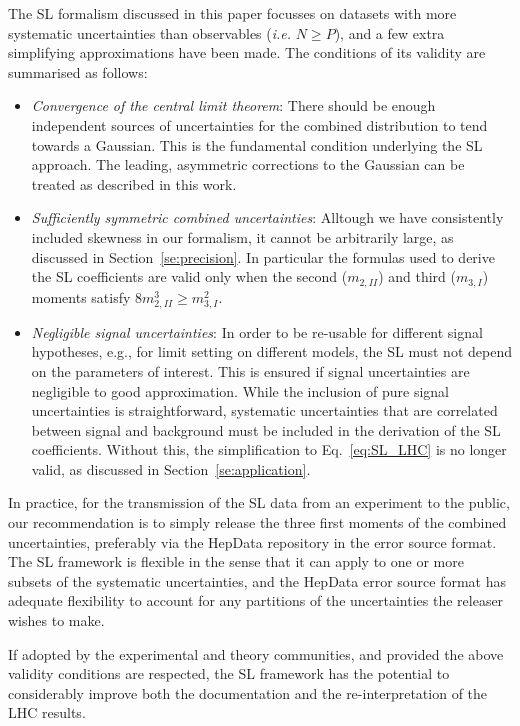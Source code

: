 \documentclass[11pt]{article}
\begin{document}
The SL formalism discussed in this paper focusses on datasets with more systematic uncertainties than observables
 (\textit{i.e.} $N\geq P$), and a few extra simplifying approximations have been made.  
The conditions of its validity are summarised as follows:
\begin{itemize}
\item \textit{Convergence of the central limit theorem}: 
There should be enough independent sources of uncertainties for the combined distribution to tend towards a Gaussian. 
This is the fundamental condition underlying the SL approach. The leading, asymmetric corrections to the Gaussian 
can be treated as described in this work.
\item \textit{Sufficiently symmetric combined uncertainties}: Alltough we have consistently included skewness in our formalism, it cannot be arbitrarily large, as discussed in Section~\ref{se:precision}. In particular the formulas used to derive the SL coefficients are valid only when the second ($m_{2,II}$) and third ($m_{3,I}$) moments satisfy $8m^{3}_{2,II}\geq m^{2}_{3,I}$. 
\item \textit{Negligible signal uncertainties}: In order to be re-usable for different signal hypotheses, e.g., for limit setting on different models, 
the SL must not depend on the parameters of interest. This is ensured if signal uncertainties are negligible to good approximation.    
While the inclusion of pure signal uncertainties is straightforward, systematic uncertainties that are correlated between signal and background must be included in the derivation of the SL coefficients. Without this, the simplification to Eq.~\eqref{eq:SL_LHC} is no longer valid, as discussed in Section~\ref{se:application}. 
\end{itemize}


In practice, for the transmission of the SL data from an experiment to the public, our recommendation is to simply release the three first moments of the combined uncertainties, preferably via the HepData repository in the error source format.  The SL framework is flexible in the sense that it can apply to one or more subsets of the systematic uncertainties,  and the HepData error source format  has adequate flexibility to account for any partitions of the uncertainties the releaser wishes to make.

If adopted by the experimental and theory communities, and provided the above validity conditions are respected, the SL framework has the potential to 
considerably improve both the documentation and the re-interpretation of the LHC results.
\end{document}
